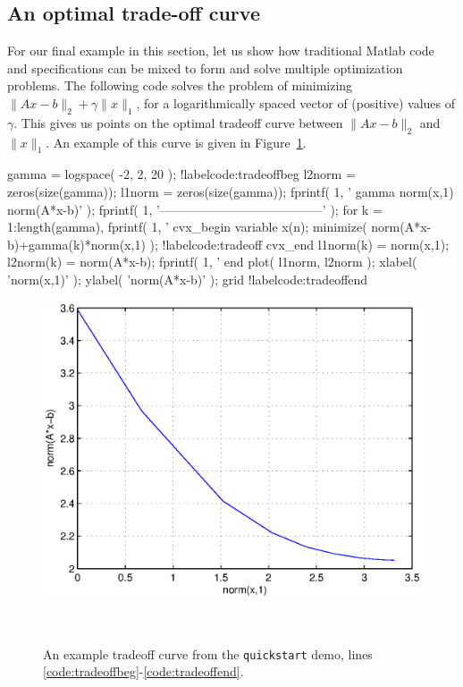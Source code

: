 \documentclass[12pt]{article}
\begin{document}
\subsection{An optimal trade-off curve}

For our final example in this section, let us show how traditional
Matlab code and \cvx specifications can be mixed to form and solve
multiple optimization problems. The following code solves the problem
of minimizing $\|Ax-b\|_2 +\gamma \|x\|_1$,
for a logarithmically spaced vector
of (positive) values of $\gamma$. This gives us points on the optimal
tradeoff curve between $\|Ax-b\|_2$ and $\|x\|_1$. An example of this
curve is given in Figure~\ref{fig:tradeoff}.
\begin{code2}[firstnumber=268]
	gamma = logspace( -2, 2, 20 ); !label{code:tradeoffbeg}
	l2norm = zeros(size(gamma));
	l1norm = zeros(size(gamma));
	fprintf( 1, '   gamma       norm(x,1)    norm(A*x-b)\n' );
	fprintf( 1, '---------------------------------------\n' );
	for k = 1:length(gamma),
	    fprintf( 1, '%
	    cvx_begin
	        variable x(n);
	        minimize( norm(A*x-b)+gamma(k)*norm(x,1) );	!label{code:tradeoff}
	    cvx_end
	    l1norm(k) = norm(x,1);
	    l2norm(k) = norm(A*x-b);
	    fprintf( 1, '   %
	end
	plot( l1norm, l2norm );
	xlabel( 'norm(x,1)' );
	ylabel( 'norm(A*x-b)' );
	grid !label{code:tradeoffend}
\end{code2}
\begin{figure}
\begin{center}
\includegraphics[width=4.5in]{tradeoff.eps}
\end{center}
~\\[-48pt]
\caption{An example tradeoff curve from the \texttt{quickstart} demo, lines \ref{code:tradeoffbeg}-\ref{code:tradeoffend}.}
\label{fig:tradeoff}
\end{figure}
\end{document}
